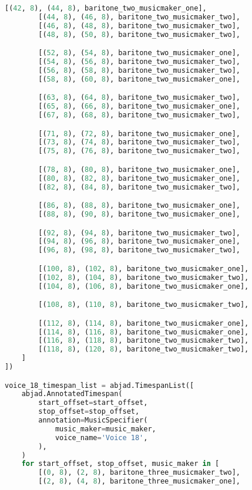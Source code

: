 \begin{lstlisting}[language=Python, caption=Invocation Source Code]
        [(42, 8), (44, 8), baritone_two_musicmaker_one],
        [(44, 8), (46, 8), baritone_two_musicmaker_two],
        [(46, 8), (48, 8), baritone_two_musicmaker_two],
        [(48, 8), (50, 8), baritone_two_musicmaker_two],

        [(52, 8), (54, 8), baritone_two_musicmaker_one],
        [(54, 8), (56, 8), baritone_two_musicmaker_two],
        [(56, 8), (58, 8), baritone_two_musicmaker_two],
        [(58, 8), (60, 8), baritone_two_musicmaker_one],

        [(63, 8), (64, 8), baritone_two_musicmaker_two],
        [(65, 8), (66, 8), baritone_two_musicmaker_one],
        [(67, 8), (68, 8), baritone_two_musicmaker_two],

        [(71, 8), (72, 8), baritone_two_musicmaker_one],
        [(73, 8), (74, 8), baritone_two_musicmaker_two],
        [(75, 8), (76, 8), baritone_two_musicmaker_two],

        [(78, 8), (80, 8), baritone_two_musicmaker_one],
        [(80, 8), (82, 8), baritone_two_musicmaker_one],
        [(82, 8), (84, 8), baritone_two_musicmaker_two],

        [(86, 8), (88, 8), baritone_two_musicmaker_one],
        [(88, 8), (90, 8), baritone_two_musicmaker_one],

        [(92, 8), (94, 8), baritone_two_musicmaker_two],
        [(94, 8), (96, 8), baritone_two_musicmaker_one],
        [(96, 8), (98, 8), baritone_two_musicmaker_two],

        [(100, 8), (102, 8), baritone_two_musicmaker_one],
        [(102, 8), (104, 8), baritone_two_musicmaker_two],
        [(104, 8), (106, 8), baritone_two_musicmaker_one],

        [(108, 8), (110, 8), baritone_two_musicmaker_two],

        [(112, 8), (114, 8), baritone_two_musicmaker_one],
        [(114, 8), (116, 8), baritone_two_musicmaker_one],
        [(116, 8), (118, 8), baritone_two_musicmaker_two],
        [(118, 8), (120, 8), baritone_two_musicmaker_two],
    ]
])

voice_18_timespan_list = abjad.TimespanList([
    abjad.AnnotatedTimespan(
        start_offset=start_offset,
        stop_offset=stop_offset,
        annotation=MusicSpecifier(
            music_maker=music_maker,
            voice_name='Voice 18',
        ),
    )
    for start_offset, stop_offset, music_maker in [
        [(0, 8), (2, 8), baritone_three_musicmaker_two],
        [(2, 8), (4, 8), baritone_three_musicmaker_one],


\end{lstlisting}
